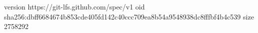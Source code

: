version https://git-lfs.github.com/spec/v1
oid sha256:dbff6684674b853cde405fd142c40ccc709ea8b54a9548938dc8fffbf4b4c539
size 2758292
